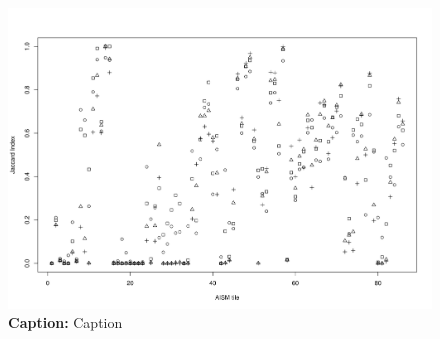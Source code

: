 	\begin{landscape}
		\begin{figure}[ht]
			\centering
			\includegraphics[scale=.65]{img/jaccard_tiles_africa}
			\caption[Caption]{\textbf{Caption:} Caption}
			\label{fig:jaccard_africa_appendix}
		\end{figure}
	\end{landscape}

